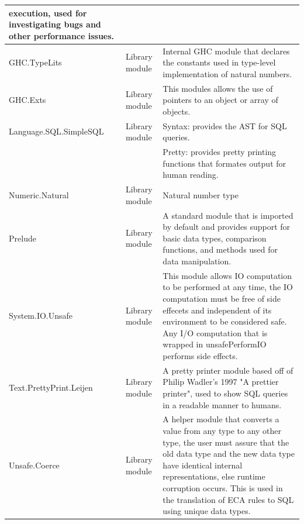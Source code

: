 \documentclass[12pt]{report}
\begin{document}
\begin{longtable}{ |m{4.5cm}|m{1.5cm}|m{7cm}|  }
    execution, used for investigating bugs and other performance issues.  \\ 
    \hline
    GHC.TypeLits & Library module & Internal GHC module that declares the 
    constants used in type-level implementation of natural numbers.  \\ 
    \hline    
    GHC.Exts & Library module & This modules allows the use of pointers to an 
    object or array of objects.  \\ \hline    
    Language.SQL.SimpleSQL & Library module & Syntax: provides the AST for SQL 
    queries. \\& & Pretty: provides pretty printing functions that formates 
    output for human reading. \\ \hline            
    Numeric.Natural & Library module & Natural number type  \\ \hline    
    Prelude & Library module & A standard module that is imported by default 
    and provides support for basic data types, comparison functions, and 
    methods used for data manipulation.   \\ \hline
    System.IO.Unsafe & Library module & This module allows IO computation to be 
    performed at any time, the IO computation must be free of side effecets and 
    independent of its environment to be considered safe. Any I/O computation 
    that is wrapped in unsafePerformIO performs side effects.  \\ \hline
    Text.PrettyPrint.Leijen & Library module & A pretty printer module based 
    off of Philip Wadler's 1997 "A prettier printer", used to show SQL queries 
    in a readable manner to humans.  \\ \hline        
    Unsafe.Coerce & Library module & A helper module that converts a value from 
    any type to any other type, the user must assure that the old data type and 
    the new data type have identical internal representations, else runtime 
    corruption occurs. This is used in the translation of ECA rules to SQL 
    using unique data types.  \\ 
    \hline  
\end{longtable}
\end{document}
